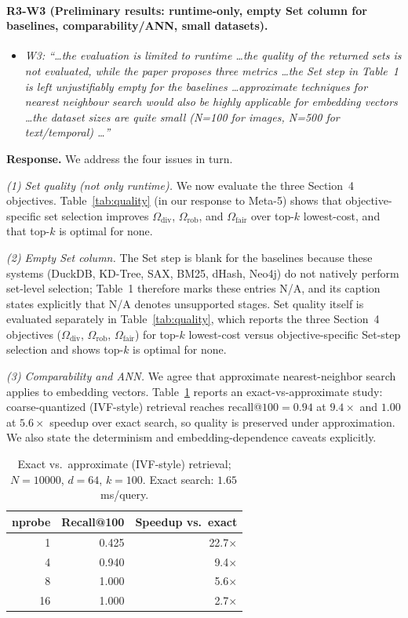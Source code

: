 \paragraph{R3-W3 (Preliminary results: runtime-only, empty Set column for baselines, comparability/ANN, small datasets).}

\begin{itemize}[leftmargin=1.2em, itemsep=1pt, topsep=2pt]
\item \textit{W3: ``\dots the evaluation is limited to runtime \dots the quality of the returned sets is not evaluated, while the paper proposes three metrics \dots the Set step in Table~1 is left unjustifiably empty for the baselines \dots approximate techniques for nearest neighbour search would also be highly applicable for embedding vectors \dots the dataset sizes are quite small (N=100 for images, N=500 for text/temporal) \dots''}
\end{itemize}
\smallskip

\noindent\textbf{Response.} We address the four issues in turn.

\emph{(1) Set quality (not only runtime).} We now evaluate the three Section~4 objectives. Table~\ref{tab:quality} (in our response to Meta-5) shows that objective-specific set selection improves $\Omega_{\text{div}}$, $\Omega_{\text{rob}}$, and $\Omega_{\text{fair}}$ over top-$k$ lowest-cost, and that top-$k$ is optimal for none.

\emph{(2) Empty Set column.} The Set step is blank for the baselines because these systems (DuckDB, KD-Tree, SAX, BM25, dHash, Neo4j) do not natively perform set-level selection; Table~1 therefore marks these entries N/A, and its caption states explicitly that N/A denotes unsupported stages. Set quality itself is evaluated separately in Table~\ref{tab:quality}, which reports the three Section~4 objectives ($\Omega_{\text{div}}$, $\Omega_{\text{rob}}$, $\Omega_{\text{fair}}$) for top-$k$ lowest-cost versus objective-specific Set-step selection and shows top-$k$ is optimal for none.

\emph{(3) Comparability and ANN.} We agree that approximate nearest-neighbor search applies to embedding vectors. Table~\ref{tab:ann} reports an exact-vs-approximate study: coarse-quantized (IVF-style) retrieval reaches recall@$100=0.94$ at $9.4\times$ and $1.00$ at $5.6\times$ speedup over exact search, so quality is preserved under approximation. We also state the determinism and embedding-dependence caveats explicitly.

\begin{table}[h]
\centering\small
\caption{Exact vs.\ approximate (IVF-style) retrieval; $N{=}10000$, $d{=}64$, $k{=}100$. Exact search: $1.65$\,ms/query.}
\label{tab:ann}
\begin{tabular}{rrr}
\toprule
nprobe & Recall@100 & Speedup vs.\ exact \\
\midrule
1  & 0.425 & 22.7$\times$ \\
4  & 0.940 & 9.4$\times$ \\
8  & 1.000 & 5.6$\times$ \\
16 & 1.000 & 2.7$\times$ \\
\bottomrule
\end{tabular}
\end{table}


